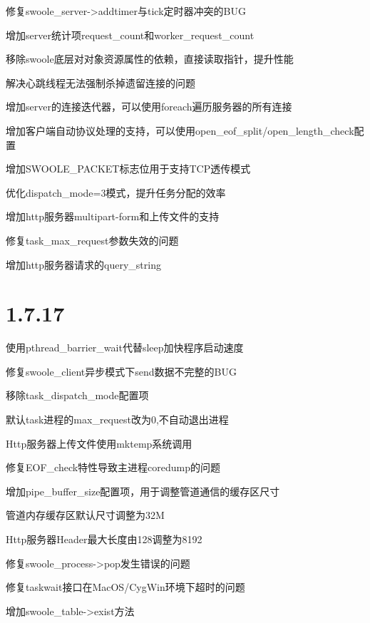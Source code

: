 \begin{compactitem}
\item 修复swoole\_server->addtimer与tick定时器冲突的BUG
\item 增加server统计项request\_count和worker\_request\_count
\item 移除swoole底层对对象资源属性的依赖，直接读取指针，提升性能
\item 解决心跳线程无法强制杀掉遗留连接的问题
\item 增加server的连接迭代器，可以使用foreach遍历服务器的所有连接
\item 增加客户端自动协议处理的支持，可以使用open\_eof\_split/open\_length\_check配置
\item 增加SWOOLE\_PACKET标志位用于支持TCP透传模式
\item 优化dispatch\_mode=3模式，提升任务分配的效率
\item 增加http服务器multipart-form和上传文件的支持
\item 修复task\_max\_request参数失效的问题
\item 增加http服务器请求的query\_string
\end{compactitem}



\section{1.7.17}


\begin{compactitem}
\item 使用pthread\_barrier\_wait代替sleep加快程序启动速度
\item 修复swoole\_client异步模式下send数据不完整的BUG
\item 移除task\_dispatch\_mode配置项
\item 默认task进程的max\_request改为0,不自动退出进程
\item Http服务器上传文件使用mktemp系统调用
\item 修复EOF\_check特性导致主进程coredump的问题
\item 增加pipe\_buffer\_size配置项，用于调整管道通信的缓存区尺寸
\item 管道内存缓存区默认尺寸调整为32M
\item Http服务器Header最大长度由128调整为8192
\item 修复swoole\_process->pop发生错误的问题
\item 修复taskwait接口在MacOS/CygWin环境下超时的问题
\item 增加swoole\_table->exist方法
\end{compactitem}



